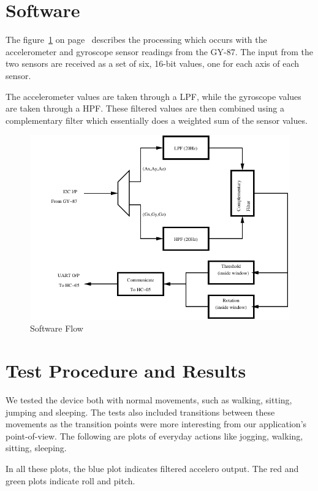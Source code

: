 \documentclass[11pt, a4paper]{article}
\begin{document}
\section{Software}
The figure~\ref{fig:sw_flow} on page~\pageref{fig:sw_flow} describes the
processing which occurs with the accelerometer and gyroscope sensor readings
from the GY-87. The input from the two sensors are received as a set of six,
16-bit values, one for each axis of each sensor. 

\noindent The accelerometer values are taken through a LPF, while the
gyroscope values are taken through a HPF. These filtered values are then
combined using a complementary filter which essentially does a weighted sum of
the sensor values.

\begin{figure}[htb]
    \centering
    \includegraphics[width=\linewidth]{SW_Flow.pdf}
    \caption{Software Flow}
    \label{fig:sw_flow}
\end{figure}


\section{Test Procedure and Results}
We tested the device both with normal movements, such as walking, sitting,
jumping and sleeping. The tests also included transitions between these
movements as the transition points were more interesting from our
application's point-of-view. The following are plots of everyday actions
like jogging, walking, sitting, sleeping.

\noindent In all these plots, the blue plot indicates filtered accelero
output.  The red and green plots indicate roll and pitch.
\end{document}
